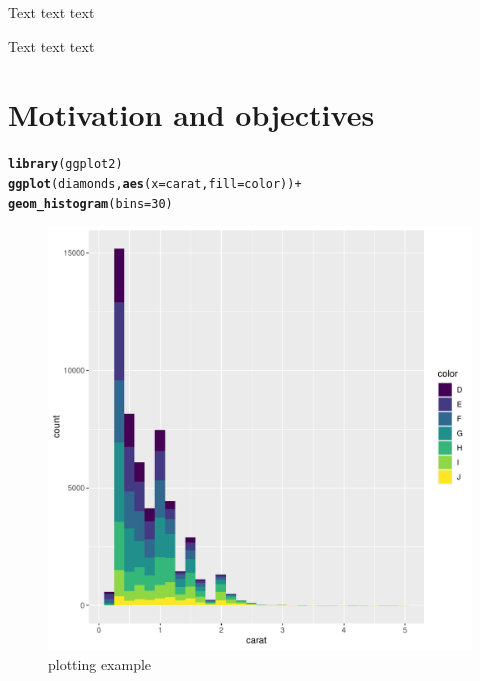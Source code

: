 \documentclass[12pt]{report}\usepackage[]{graphicx}\usepackage[]{xcolor}
\makeatletter
\newcommand{\hlnum}[1]{\textcolor[rgb]{0.686,0.059,0.569}{#1}}%
\newcommand{\hlopt}[1]{\textcolor[rgb]{0,0,0}{#1}}%
\newcommand{\hlstd}[1]{\textcolor[rgb]{0.345,0.345,0.345}{#1}}%
\newcommand{\hlkwc}[1]{\textcolor[rgb]{0.333,0.667,0.333}{#1}}%
\newcommand{\hlkwd}[1]{\textcolor[rgb]{0.737,0.353,0.396}{\textbf{#1}}}%
\newenvironment{kframe}{%
 \def\at@end@of@kframe{}%
 \ifinner\ifhmode%
  \def\at@end@of@kframe{\end{minipage}}%
  \begin{minipage}{\columnwidth}%
 \fi\fi%
 \def\FrameCommand##1{\hskip\@totalleftmargin \hskip-\fboxsep
 \colorbox{shadecolor}{##1}\hskip-\fboxsep
     \hskip-\linewidth \hskip-\@totalleftmargin \hskip\columnwidth}%
 \MakeFramed {\advance\hsize-\width
   \@totalleftmargin\z@ \linewidth\hsize
   \@setminipage}}%
 {\par\unskip\endMakeFramed%
 \at@end@of@kframe}
\newenvironment{knitrout}{}{} %
\makeatother
\begin{document}
    Text text text

    Text text text

    \pagebreak

    \chapter*{Motivation and objectives}\label{ch:sec1}

\begin{knitrout}
\color{fgcolor}\begin{kframe}
\begin{alltt}
\hlkwd{library}\hlstd{(ggplot2)}
\hlkwd{ggplot}\hlstd{(diamonds,} \hlkwd{aes}\hlstd{(}\hlkwc{x} \hlstd{= carat,} \hlkwc{fill} \hlstd{= color))} \hlopt{+}
  \hlkwd{geom_histogram}\hlstd{(}\hlkwc{bins} \hlstd{=} \hlnum{30}\hlstd{)}
\end{alltt}
\end{kframe}\begin{figure}[H]

{\centering \includegraphics[width=0.75\linewidth]{figure/Carat_and_color-1} 

}

\caption{\label{fig:fig1}plotting example}\label{fig:Carat and color}
\end{figure}

\end{knitrout}
\end{document}
